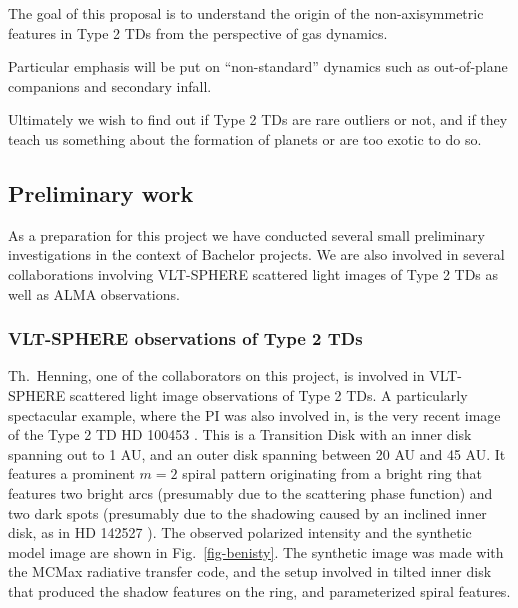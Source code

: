 \documentclass[10pt,fleqn,twoside]{article}
\begin{document}
\begin{highlight}
The goal of this proposal is to understand the origin of the non-axisymmetric
features in Type 2 TDs from the perspective of gas dynamics.
\end{highlight}
Particular
emphasis will be put on ``non-standard'' dynamics such as out-of-plane
companions and secondary infall.
\begin{highlight}
Ultimately we wish
to find out if Type 2 TDs are rare outliers or not, and if they teach us
something about the formation of planets or are too exotic to do so.
\end{highlight}



\subsection{Preliminary work}
As a preparation for this project we have conducted several small
preliminary investigations in the context of Bachelor projects. We are also
involved in several collaborations involving VLT-SPHERE scattered light
images of Type 2 TDs as well as ALMA observations.

\subsubsection{VLT-SPHERE observations of Type 2 TDs}
Th.~Henning, one of the collaborators on this project, is involved in
VLT-SPHERE scattered light image observations of Type 2 TDs. A particularly
spectacular example, where the PI was also involved in, is the very recent
image of the Type 2 TD HD 100453 \citep{2016arXiv161010089B}. This is a
Transition Disk with an inner disk spanning out to 1 AU, and an outer disk
spanning between 20 AU and 45 AU. It features a prominent $m=2$ spiral
pattern originating from a bright ring that features two bright arcs
(presumably due to the scattering phase function) and two dark spots
(presumably due to the shadowing caused by an inclined inner disk, as in HD
142527 \citep{2015ApJ...798L..44M}). The observed polarized intensity
and the synthetic model image are shown in Fig.~\ref{fig-benisty}. The
synthetic image was made with the MCMax radiative transfer code, and
the setup involved in tilted inner disk that produced the shadow features
on the ring, and parameterized spiral features.
\end{document}
